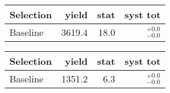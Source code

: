 \begin{tabular}{l|rrr}
\toprule
   Selection & yield & stat & syst tot   \\ 
\midrule
    Baseline & 3619.4 & 18.0 & ${}^{+0.0}_{-0.0}$ \\
\bottomrule
\end{tabular}



\begin{tabular}{l|rrr}
\toprule
   Selection & yield & stat & syst tot   \\ 
\midrule
    Baseline & 1351.2 & 6.3 & ${}^{+0.0}_{-0.0}$ \\
\bottomrule
\end{tabular}

